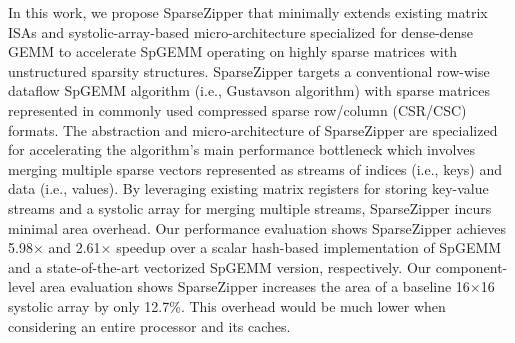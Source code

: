 
In this work, we propose SparseZipper that minimally extends existing
matrix ISAs and systolic-array-based micro-architecture specialized for
dense-dense GEMM to accelerate SpGEMM operating on highly sparse matrices
with unstructured sparsity structures. SparseZipper targets a conventional
row-wise dataflow SpGEMM algorithm (i.e., Gustavson algorithm) with sparse
matrices represented in commonly used compressed sparse row/column
(CSR/CSC) formats. The abstraction and micro-architecture of SparseZipper
are specialized for accelerating the algorithm's main performance
bottleneck which involves merging multiple sparse vectors represented as
streams of indices (i.e., keys) and data (i.e., values).
By leveraging existing matrix registers for storing key-value streams and a
systolic array for merging multiple streams, SparseZipper incurs minimal area
overhead.
Our performance evaluation shows SparseZipper achieves 5.98$\times$ and
2.61$\times$ speedup over a scalar hash-based implementation of SpGEMM and a
state-of-the-art vectorized SpGEMM version, respectively.
Our component-level area evaluation shows SparseZipper increases the area of a
baseline 16$\times$16 systolic array by only 12.7\%.
This overhead would be much lower when considering an entire processor and its
caches.


